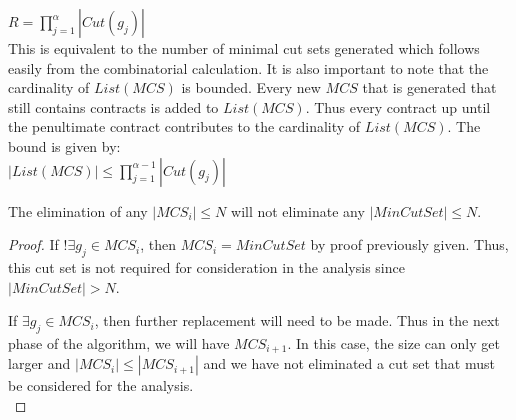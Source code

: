 $R = {\displaystyle \prod_{j=1}^{\alpha } |Cut(g_j)|}$ \\

This is equivalent to the number of minimal cut sets generated which follows easily from the combinatorial calculation. It is also important to note that the cardinality of $List(MCS)$ is bounded. Every new $MCS$ that is generated that still contains contracts is added to $List(MCS)$. Thus every contract up until the penultimate contract contributes to the cardinality of $List(MCS)$. The bound is given by: \\

$|List(MCS)| \leq {\displaystyle \prod_{j=1}^{\alpha -1} |Cut(g_j)|}$\\

\begin{theorem} 
The elimination of any $|MCS_i| \leq N$ will not eliminate any $|MinCutSet| \leq N$. \\

\begin{proof} 

If $!\exists g_j \in MCS_i$, then $MCS_i = MinCutSet$ by proof previously given. Thus, this cut set is not required for consideration in the analysis since $|MinCutSet| > N$. 

If $\exists g_j \in MCS_i$, then further replacement will need to be made. Thus in the next phase of the algorithm, we will have $MCS_{i+1}$. In this case, the size can only get larger and $|MCS_i| \leq |MCS_{i+1}|$ and we have not eliminated a cut set that must be considered for the analysis. \\

\end{proof}
\end{theorem}

































